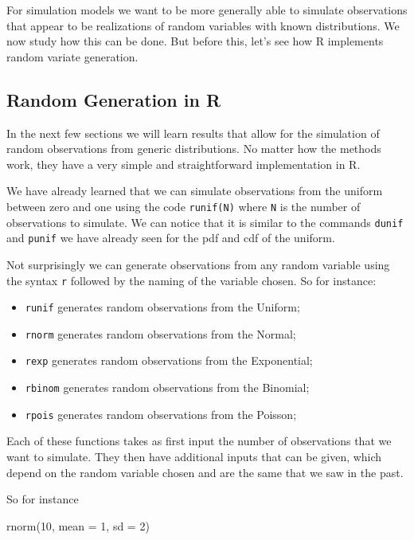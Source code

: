 \documentclass[
]{book}
\newenvironment{Shaded}{\begin{snugshade}}{\end{snugshade}}
\newcommand{\AttributeTok}[1]{\textcolor[rgb]{0.77,0.63,0.00}{#1}}
\newcommand{\DecValTok}[1]{\textcolor[rgb]{0.00,0.00,0.81}{#1}}
\newcommand{\FunctionTok}[1]{\textcolor[rgb]{0.00,0.00,0.00}{#1}}
\newcommand{\NormalTok}[1]{#1}
\begin{document}
For simulation models we want to be more generally able to simulate observations that appear to be realizations of random variables with known distributions. We now study how this can be done. But before this, let's see how R implements random variate generation.

\hypertarget{random-generation-in-r}{%
\subsection{Random Generation in R}\label{random-generation-in-r}}

In the next few sections we will learn results that allow for the simulation of random observations from generic distributions. No matter how the methods work, they have a very simple and straightforward implementation in R.

We have already learned that we can simulate observations from the uniform between zero and one using the code \texttt{runif(N)} where \texttt{N} is the number of observations to simulate. We can notice that it is similar to the commands \texttt{dunif} and \texttt{punif} we have already seen for the pdf and cdf of the uniform.

Not surprisingly we can generate observations from any random variable using the syntax \texttt{r} followed by the naming of the variable chosen. So for instance:

\begin{itemize}
\item
  \texttt{runif} generates random observations from the Uniform;
\item
  \texttt{rnorm} generates random observations from the Normal;
\item
  \texttt{rexp} generates random observations from the Exponential;
\item
  \texttt{rbinom} generates random observations from the Binomial;
\item
  \texttt{rpois} generates random observations from the Poisson;
\end{itemize}

Each of these functions takes as first input the number of observations that we want to simulate. They then have additional inputs that can be given, which depend on the random variable chosen and are the same that we saw in the past.

So for instance

\begin{Shaded}
\begin{Highlighting}[]
\FunctionTok{rnorm}\NormalTok{(}\DecValTok{10}\NormalTok{, }\AttributeTok{mean =} \DecValTok{1}\NormalTok{, }\AttributeTok{sd =} \DecValTok{2}\NormalTok{)}
\end{Highlighting}
\end{Shaded}
\end{document}
